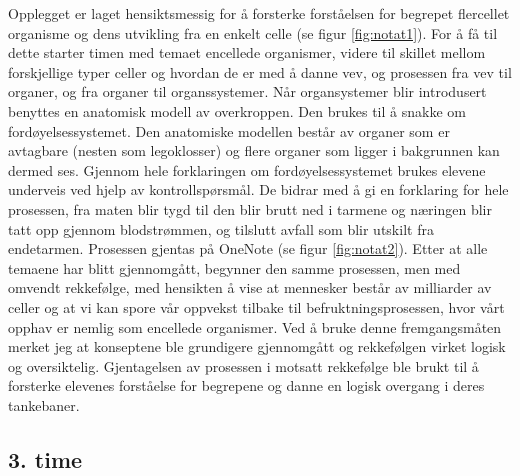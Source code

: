 \documentclass[main.tex]{subfiles}
\begin{document}
Opplegget er laget hensiktsmessig for å forsterke forståelsen for begrepet flercellet organisme og dens utvikling fra 
en enkelt celle (se figur \ref{fig:notat1}). For å få til dette starter timen med temaet encellede organismer, 
videre til skillet mellom forskjellige typer celler og hvordan de er med å danne vev, og prosessen fra vev til
organer, og fra organer til organssystemer. Når organsystemer blir introdusert benyttes 
en anatomisk modell av overkroppen. Den brukes til å snakke om fordøyelsessystemet.
Den anatomiske modellen består av organer som er avtagbare (nesten som legoklosser) og flere organer 
som ligger i bakgrunnen kan dermed ses. Gjennom hele forklaringen om fordøyelsessystemet brukes
elevene underveis ved hjelp av kontrollspørsmål. De bidrar med å gi en forklaring for hele prosessen, 
fra maten blir tygd til den blir brutt ned i tarmene og næringen blir tatt opp gjennom blodstrømmen, 
og tilslutt avfall som blir utskilt fra endetarmen. Prosessen gjentas på OneNote (se figur \ref{fig:notat2}). 
Etter at alle temaene har blitt gjennomgått, begynner den samme prosessen, 
men med omvendt rekkefølge, med hensikten å vise at mennesker består av milliarder av celler og 
at vi kan spore vår oppvekst tilbake til befruktningsprosessen, hvor vårt opphav er nemlig som
encellede organismer. Ved å bruke denne fremgangsmåten merket jeg at konseptene ble grundigere
gjennomgått og rekkefølgen virket logisk og oversiktelig. Gjentagelsen av prosessen i motsatt
rekkefølge ble brukt til å forsterke elevenes forståelse for begrepene og danne en logisk 
overgang i deres tankebaner. 

\subsection*{3. time}
\end{document}
